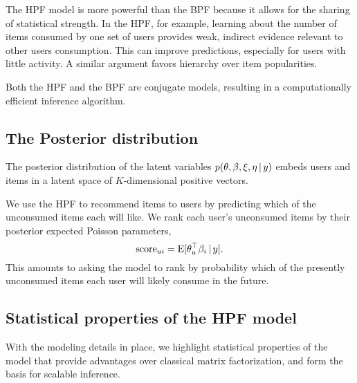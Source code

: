 The HPF model is more powerful than the BPF because it allows for the
sharing of statistical strength. In the HPF, for example, learning
about the number of items consumed by one set of users provides weak,
indirect evidence relevant to other users consumption. This can
improve predictions, especially for users with little activity. A
similar argument favors hierarchy over item popularities. 

Both the HPF and the BPF are conjugate models, resulting in a
computationally efficient inference algorithm.

\subsection{The Posterior distribution}
The posterior distribution of the latent variables $p(\theta, \beta,
\xi, \eta \,\vert\, y)$ embeds users and items in a latent space of
$K$-dimensional positive vectors. 

We use the HPF to recommend items to users by predicting which of the
unconsumed items each will like.  We rank each user's unconsumed items
by their posterior expected Poisson parameters,
\begin{equation}
  \label{eq:score}
  \textrm{score}_{ui} = \textrm{E}[\theta_u^\top \beta_i \,\vert\, y].
\end{equation}
This amounts to asking the model to rank by probability which of the
presently unconsumed items each user will likely consume in the
future.

\subsection{Statistical properties of the HPF model}
With the modeling details in place, we highlight statistical
properties of the model that provide advantages over classical matrix
factorization, and form the basis for scalable inference.

